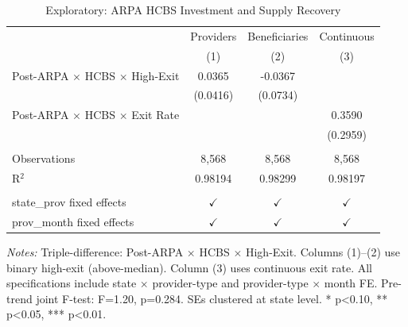 
\begin{table}[htbp]
   \caption{\label{tab:ddd} Exploratory: ARPA HCBS Investment and Supply Recovery}
   \bigskip
   \centering
   \begin{tabular}{lccc}
      \toprule
                                                   & Providers     & Beneficiaries & Continuous \\   
                                                   & (1)           & (2)           & (3)\\  
      \midrule 
      Post-ARPA $\times$ HCBS $\times$ High-Exit   & 0.0365        & -0.0367       &   \\   
                                                   & (0.0416)      & (0.0734)      &   \\   
      Post-ARPA $\times$ HCBS $\times$ Exit Rate   &               &               & 0.3590\\   
                                                   &               &               & (0.2959)\\   
       \\
      Observations                                 & 8,568         & 8,568         & 8,568\\  
      R$^2$                                        & 0.98194       & 0.98299       & 0.98197\\  
       \\
      state\_prov fixed effects                    & $\checkmark$  & $\checkmark$  & $\checkmark$\\   
      prov\_month fixed effects                    & $\checkmark$  & $\checkmark$  & $\checkmark$\\   
      \bottomrule
   \end{tabular}
   
   \par \raggedright 
   \textit{Notes:} Triple-difference: Post-ARPA $\times$ HCBS $\times$ High-Exit. Columns (1)--(2) use binary high-exit (above-median). Column (3) uses continuous exit rate. All specifications include state $\times$ provider-type and provider-type $\times$ month FE. Pre-trend joint F-test: F=1.20, p=0.284. SEs clustered at state level. * p<0.10, ** p<0.05, *** p<0.01.
\end{table}


